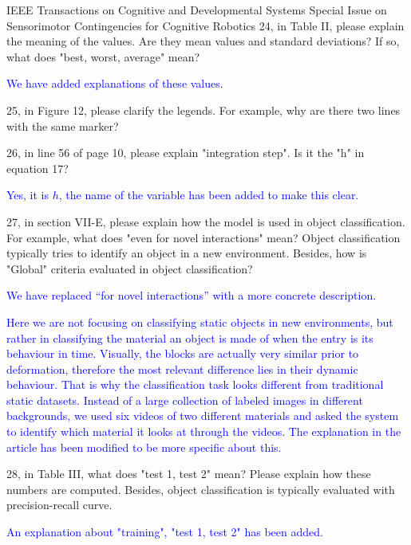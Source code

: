 \documentclass[a4paper,12pt]{letter}
\newcommand{\comment}[1]{\textcolor{blue}{#1}}
\begin{document}
\begin{letter}{IEEE Transactions on Cognitive and Developmental Systems\newline
Special Issue on Sensorimotor Contingencies for Cognitive Robotics}
24, in Table II, please explain the meaning of the values. Are they mean values and standard deviations? If so, what does "best, worst, average" mean?

\comment{We have added explanations of these values.}

25, in Figure 12, please clarify the legends. For example, why are there two lines with the same marker?


26, in line 56 of page 10, please explain "integration step". Is it the "h" in equation 17?

\comment{Yes, it is $h$, the name of the variable has been added to make this clear.}

27, in section VII-E, please explain how the model is used in object classification. For example, what does "even for novel interactions" mean? Object classification typically tries to identify an object in a new environment. Besides, how is "Global" criteria evaluated in object classification? 

\comment{We have replaced ``for novel interactions'' with a more concrete description.}

\comment{Here we are not focusing on classifying static objects in new environments, but rather in classifying the material an object is made of when the entry is its behaviour in time.  Visually, the blocks are actually very similar prior to deformation, therefore the most relevant difference lies in their dynamic behaviour.  That is why the classification task looks different from traditional static datasets.  Instead of a large collection of labeled images in different backgrounds, we used six videos of two different materials and asked the system to identify which material it looks at through the videos.  The explanation in the article has been modified to be more specific about this.}

\newpage 

28, in Table III, what does "test 1, test 2" mean? Please explain how these numbers are computed. Besides, object classification is typically evaluated with precision-recall curve.

\comment{An explanation about "training", "test 1, test 2" has been added.}


\end{letter}
\end{document}
